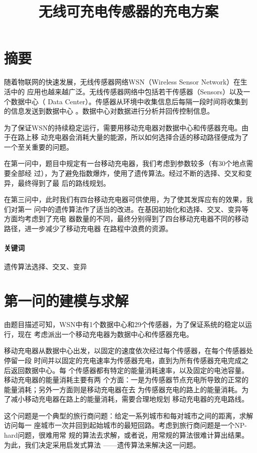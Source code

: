 \documentclass{ctexart}
\title{无线可充电传感器的充电方案}
\date{}
\begin{document}
    \maketitle

    \section*{摘要}
    随着物联网的快速发展，无线传感器网络WSN（Wireless Sensor Network）在生活中的
    应用也越来越广泛。无线传感器网络中包括若干传感器（Sensors）以及一个数据中心（
    Data Center）。传感器从环境中收集信息后每隔一段时间将收集到的信息发送到数据中心
    。数据中心对数据进行分析并回传控制信息。

    为了保证WSN的持续稳定运行，需要用移动充电器对数据中心和传感器充电。由于在路上移
    动充电器会消耗大量的能源，所以如何选择合适的移动路径便成为了一个至关重要的问题。
    
    在第一问中，题目中规定有一台移动充电器，我们考虑到参数较多（有30个地点需要全部经
    过），为了避免指数爆炸，使用了遗传算法。经过不断的选择、交叉和变异，最终得到了最
    后的路线规划。

    在第三问中，此时我们有四台移动充电器可供使用，为了使其发挥应有的效果，我们对第一
    问中的遗传算法作了适当的改进。在基因初始化和选择、交叉、变异等方面均考虑到了充电
    器数量的不同，最终分别得到了四台移动充电器不同的移动路径，进一步减少了移动充电器
    在路程中浪费的资源。
    
    \paragraph{关键词}遗传算法选择、交叉、变异
    \newpage
    \section{第一问的建模与求解}
    由题目描述可知，WSN中有1个数据中心和29个传感器，为了保证系统的稳定以运行，现在
    考虑派出一个移动充电器为数据中心和传感器充电。

    移动充电器从数据中心出发，以固定的速度依次经过每个传感器，在每个传感器处停留一段
    时间并以固定的充电速率为传感器充电，直到为所有传感器充电完成之后返回数据中心。每
    个传感器都有特定的能量消耗速率，以及固定的电池容量。移动充电器的能量消耗主要有两
    个方面：一是为传感器节点充电所导致的正常的能量消耗；另外一方面则是移动充电器在去
    为传感器充电的路上的能量消耗。为了减小移动充电器在路上的能量消耗，需要合理地规划
    移动充电器的充电路线。

    这个问题是一个典型的旅行商问题：给定一系列城市和每对城市之间的距离，求解访问每一
    座城市一次并回到起始城市的最短回路。考虑到旅行商问题是一个NP-hard问题，很难用常
    规的算法去求解，或者说，用常规的算法很难计算出结果。为此，我们决定采用启发式算法
    ——遗传算法来解决这一问题。
\end{document}

